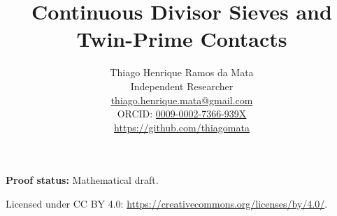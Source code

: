 \documentclass[11pt]{article}
\title{Continuous Divisor Sieves and Twin-Prime Contacts}
\author{Thiago Henrique Ramos da Mata\\
\small Independent Researcher\\
\small \href{mailto:thiago.henrique.mata@gmail.com}{thiago.henrique.mata@gmail.com}\\
\small ORCID: \href{https://orcid.org/0009-0002-7366-939X}{0009-0002-7366-939X}\\
\small \url{https://github.com/thiagomata}}
\date{}
\begin{document}
\maketitle
\begin{center}
\small\textbf{Proof status:} Mathematical draft.
\end{center}

\begin{center}
\small Licensed under CC BY 4.0: \url{https://creativecommons.org/licenses/by/4.0/}.
\end{center}














{\raggedright\par}
\end{document}
